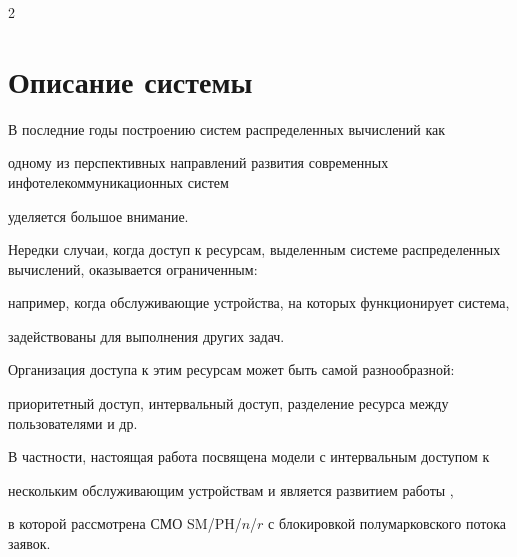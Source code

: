 









      \thispagestyle{headings}





      \begin{multicols}{2}





      \label{st\stat}











\section{Описание системы}





В последние годы построению систем распределенных вычислений как


одному из перспективных направлений развития современных инфотелекоммуникационных систем


уделяется большое внимание.


Нередки случаи, когда доступ к ресурсам, выделенным системе распределенных вычислений, оказывается ограниченным:


например, когда обслуживающие устройства, на которых функционирует система,


задействованы для выполнения других задач.


Организация доступа к этим ресурсам может быть самой разнообразной:


приоритетный доступ, интервальный доступ, разделение ресурса между пользователями и др.


В частности, настоящая работа посвящена модели с интервальным доступом к


нескольким обслуживающим устройствам и является развитием работы \cite{C08},


в которой рассмотрена СМО SM/PH/$n$/$r$ с блокировкой полумарковского потока заявок.



\end{multicols}
